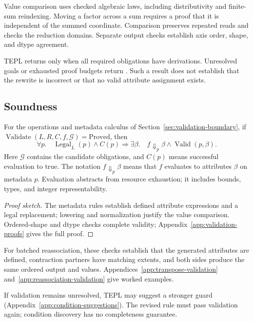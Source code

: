 Value comparison uses checked algebraic laws, including
distributivity and finite-sum reindexing. Moving a factor across a
sum requires a proof that it is independent of the summed coordinate.
Comparison preserves repeated reads and checks the reduction domains.
Separate output checks establish axis order, shape, and dtype
agreement.

TEPL returns  only when all required obligations have
derivations. Unresolved goals or exhausted proof budgets return
. Such a result does not establish that the rewrite is
incorrect or that no valid attribute assignment exists.

\subsection{Soundness}
\label{sec:acceptance-soundness}
\begin{theorem}
\label{thm:validator-soundness}
For the operations and metadata calculus of
Section~\ref{sec:validation-boundary}, if
$\operatorname{Validate}(L,R,C,f,\mathcal G)=\mathrm{Proved}$, then
\begin{equation}
 \forall p.\quad \operatorname{Legal}_L(p)\land C(p)
 \Longrightarrow\exists\beta.\quad f\Downarrow_p\beta
 \land\operatorname{Valid}(p,\beta).
 \label{eq:acceptance-soundness}
\end{equation}
Here $\mathcal G$ contains the candidate obligations, and $C(p)$
means successful evaluation to true. The notation $f\Downarrow_p\beta$
means that $f$ evaluates to attributes $\beta$ on metadata $p$.
Evaluation abstracts from resource exhaustion; it includes bounds,
types, and integer representability.
\end{theorem}

\begin{proof}[Proof sketch]
The metadata rules establish defined attribute expressions and a
legal replacement; lowering and normalization justify the value
comparison. Ordered-shape and dtype checks complete validity;
Appendix~\ref{app:validation-proofs} gives the full proof.
\end{proof}

For batched reassociation, these checks establish that the generated
attributes are defined, contraction partners have matching extents,
and both sides produce the same ordered output and values.
Appendices~\ref{app:transpose-validation}
and~\ref{app:reassociation-validation} give worked examples.

If validation remains unresolved, TEPL may suggest a stronger guard
(Appendix~\ref{app:condition-suggestions}). The revised rule must pass
validation again; condition discovery has no completeness guarantee.

